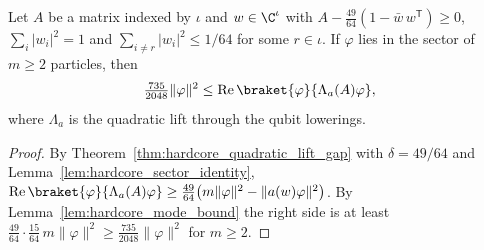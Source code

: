 \begin{theorem}
    \label{thm:hardcore_sector_energy}
    \leanok
    Let $A$ be a matrix indexed by $\iota$ and $w\in\C^\iota$ with
    $A-\tfrac{49}{64}(1-\bar w\,w^{\mathsf T})\ge0$, $\sum_i|w_i|^2=1$ and
    $\sum_{i\neq r}|w_i|^2\le1/64$ for some $r\in\iota$. If $\varphi$ lies in the sector
    of $m\ge2$ particles, then
    \begin{align*}
        \tfrac{735}{2048}\lVert\varphi\rVert^2
        \le\operatorname{Re}\braket{\varphi}{\Lambda_a(A)\varphi},
    \end{align*}
    where $\Lambda_a$ is the quadratic lift through the qubit lowerings.
\end{theorem}
\begin{proof}\leanok
    By Theorem~\ref{thm:hardcore_quadratic_lift_gap} with $\delta=49/64$ and
    Lemma~\ref{lem:hardcore_sector_identity},
    $\operatorname{Re}\braket{\varphi}{\Lambda_a(A)\varphi}\ge\tfrac{49}{64}\bigl(
        m\lVert\varphi\rVert^2-\lVert a(w)\varphi\rVert^2\bigr)$. By
    Lemma~\ref{lem:hardcore_mode_bound} the right side is at least
    $\tfrac{49}{64}\cdot\tfrac{15}{64}\,m\lVert\varphi\rVert^2\ge
        \tfrac{735}{2048}\lVert\varphi\rVert^2$ for $m\ge2$.
\end{proof}
